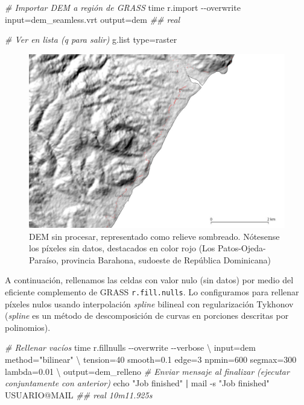 \documentclass[spanish]{article}
\newenvironment{Shaded}{\begin{snugshade}}{\end{snugshade}}
\newcommand{\AttributeTok}[1]{\textcolor[rgb]{0.77,0.63,0.00}{#1}}
\newcommand{\BuiltInTok}[1]{#1}
\newcommand{\CommentTok}[1]{\textcolor[rgb]{0.56,0.35,0.01}{\textit{#1}}}
\newcommand{\DataTypeTok}[1]{\textcolor[rgb]{0.13,0.29,0.53}{#1}}
\newcommand{\ExtensionTok}[1]{#1}
\newcommand{\KeywordTok}[1]{\textcolor[rgb]{0.13,0.29,0.53}{\textbf{#1}}}
\newcommand{\NormalTok}[1]{#1}
\newcommand{\StringTok}[1]{\textcolor[rgb]{0.31,0.60,0.02}{#1}}
\begin{document}
\begin{Shaded}
\begin{Highlighting}[]
\CommentTok{\# Importar DEM a región de GRASS}
\BuiltInTok{time}\NormalTok{ r.import }\AttributeTok{{-}{-}overwrite}\NormalTok{ input=dem\_seamless.vrt output=dem}
\CommentTok{\#\# real }

\CommentTok{\# Ver en lista (q para salir)}
\ExtensionTok{g.list}\NormalTok{ type=raster}
\end{Highlighting}
\end{Shaded}

\begin{figure}

{\centering \includegraphics[width=1\linewidth]{figuras/dem-sin-procesar} 

}

\caption{DEM sin procesar, representado como relieve sombreado. Nótesense los píxeles sin datos, destacados en color rojo (Los Patos-Ojeda-Paraíso, provincia Barahona, sudoeste de República Dominicana)}\label{fig:demsinprocesar}
\end{figure}

A continuación, rellenamos las celdas con valor nulo (sin datos) por
medio del eficiente complemento de GRASS \texttt{r.fill.nulls}. Lo
configuramos para rellenar píxeles nulos usando interpolación
\emph{spline} bilineal con regularización Tykhonov (\emph{spline} es un
método de descomposición de curvas en porciones descritas por
polinomios).

\begin{Shaded}
\begin{Highlighting}[]
\CommentTok{\# Rellenar vacíos}
\BuiltInTok{time}\NormalTok{ r.fillnulls }\AttributeTok{{-}{-}overwrite} \AttributeTok{{-}{-}verbose} \DataTypeTok{\textbackslash{}}
\NormalTok{  input=dem method=}\StringTok{"bilinear"} \DataTypeTok{\textbackslash{}}
\NormalTok{  tension=40 smooth=0.1 edge=3 npmin=600 segmax=300 lambda=0.01 }\DataTypeTok{\textbackslash{}}
\NormalTok{  output=dem\_relleno}
\CommentTok{\# Enviar mensaje al finalizar (ejecutar conjuntamente con anterior)}
\BuiltInTok{echo} \StringTok{"Job finished"} \KeywordTok{|} \ExtensionTok{mail} \AttributeTok{{-}s} \StringTok{"Job finished"}\NormalTok{ USUARIO@MAIL}
\CommentTok{\#\# real 10m11.925s}
\end{Highlighting}
\end{Shaded}
\end{document}
